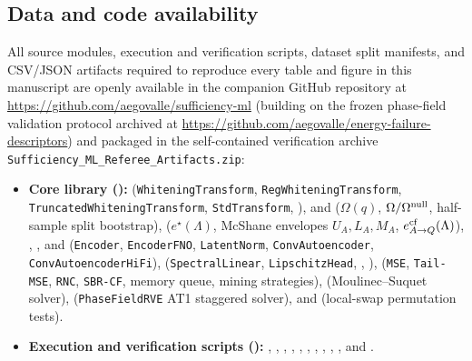 \documentclass[preprint,11pt,a4paper]{elsarticle}
\newcommand{\ecf}{e^{\rm cf}}
\begin{document}
\subsection{Data and code availability}

\begin{sloppypar}
All source modules, execution and verification scripts, dataset split manifests, and CSV/JSON artifacts required to reproduce every table and figure in this manuscript are openly available in the companion GitHub repository at \url{https://github.com/aegovalle/sufficiency-ml} (building on the frozen phase-field validation protocol archived at \url{https://github.com/aegovalle/energy-failure-descriptors}) and packaged in the self-contained verification archive \texttt{Sufficiency\_ML\_Referee\_Artifacts.zip}:
\begin{itemize}
    \item \textbf{Core library ():}  (\texttt{WhiteningTransform}, \texttt{RegWhiteningTransform}, \texttt{TruncatedWhiteningTransform}, \texttt{StdTransform}, ),  and  ($\Omega(q)$, $\Omega/\Omega^{\rm null}$, half-sample split bootstrap),  ($e^\star(\Lambda)$, McShane envelopes $U_A, L_A, M_A$, $\ecf_{A\to Q}(\Lambda)$), , , and  (\texttt{Encoder}, \texttt{EncoderFNO}, \texttt{LatentNorm}, \texttt{ConvAutoencoder}, \texttt{ConvAutoencoderHiFi}),  (\texttt{SpectralLinear}, \texttt{LipschitzHead}, , ),  (\texttt{MSE}, \texttt{Tail-MSE}, \texttt{RNC}, \texttt{SBR-CF}, memory queue, mining strategies),  (Moulinec--Suquet solver),  (\texttt{PhaseFieldRVE} AT1 staggered solver), and  (local-swap permutation tests).
    \item \textbf{Execution and verification scripts ():} , , , , , , , , , , and .

\end{itemize}
\end{sloppypar}
\end{document}
